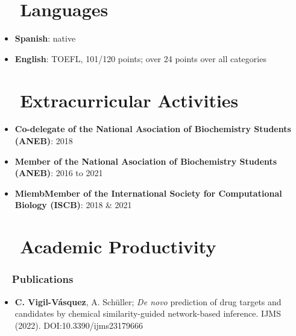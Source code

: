 \documentclass[letter,20pt]{article}
\newcommand{\resumeItem}[2]{
  \item\small{
    \textbf{#1}{: #2 \vspace{-2pt}}
  }
}
\newcommand{\resumeItemWithoutTitle}[1]{
  \item\small{
    {\vspace{-2pt}}
  }
}
\newcommand{\resumeSubItem}[2]{\resumeItem{#1}{#2}\vspace{-3pt}}
\newcommand{\resumeSubHeadingListStart}{\begin{itemize}[leftmargin=*]}
\newcommand{\resumeSubHeadingListEnd}{\end{itemize}}
\begin{document}
\section{~~Languages}
\resumeSubHeadingListStart
\resumeSubItem{Spanish}{native}
\resumeSubItem{English}{TOEFL, 101/120 points; over 24 points over all categories}
\resumeSubHeadingListEnd
\vspace{5pt}
\section{~~Extracurricular Activities}
\resumeSubHeadingListStart
\resumeSubItem{Co-delegate of the National Asociation of Biochemistry Students (ANEB)}{2018}
\resumeSubItem{Member of the National Asociation of Biochemistry Students (ANEB)}{2016 to 2021}
\resumeSubItem{MiembMember of the International Society for Computational Biology (ISCB)}{2018 \& 2021}
\resumeSubHeadingListEnd
\vspace{5pt}
\section{~~Academic Productivity}
\subsubsection*{~~Publications}
\resumeSubHeadingListStart
\vspace{2pt}
\resumeItemWithoutTitle{}{\textbf{C. Vigil-Vásquez}, A. Schüller; \textit{De novo} prediction of drug targets and candidates by chemical similarity-guided network-based inference. IJMS (2022). DOI:10.3390/ijms23179666}
\resumeSubHeadingListEnd

\end{document}
